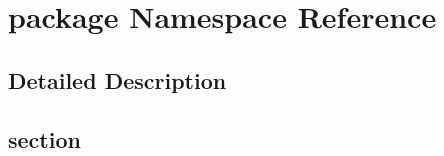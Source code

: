 \hypertarget{namespacepackage}{\section{package Namespace Reference}
\label{namespacepackage}
}


\subsection{Detailed Description}
\hypertarget{/root/SSDPI/frontend/class.MenuGrabber.php_section}{}\subsection{section}\label{/root/SSDPI/frontend/class.MenuGrabber.php_section}

